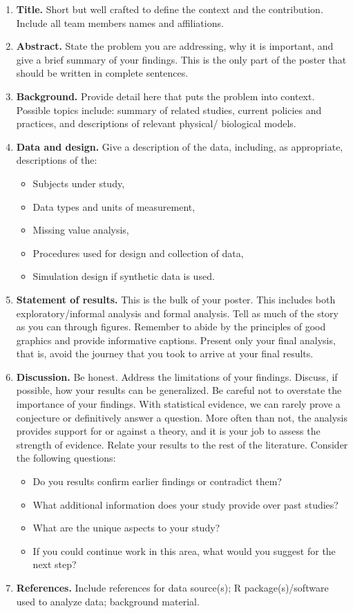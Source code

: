 \documentclass[11pt,onecolumn]{article}
\begin{document}
\begin{enumerate}
  \itemsep0em
\item{\bf Title.} Short but well crafted to define the context and the contribution. Include all team members names and  affiliations.
\item{\bf Abstract.} State the problem you are addressing, why it is important, and give a brief summary of your findings. This is the only part of the poster that should be written in complete sentences.
\item{\bf Background.} Provide detail here that puts the problem into context. Possible topics include: summary of related studies, current policies and practices, and descriptions of relevant physical/ biological models.
\item{\bf Data and design.} Give a description of the data, including, as appropriate, descriptions of the:
  \begin{itemize}
  \item Subjects under study,
  \item Data types and units of measurement,
  \item Missing value analysis,
  \item Procedures used for design and collection of data,
  \item Simulation design if synthetic data is used.
  \end{itemize}
    
\item{\bf Statement of results.} This is the bulk of your poster. This includes both exploratory/informal analysis and formal analysis. Tell as much of the story as you can through figures. Remember to abide by the principles of good graphics and provide informative captions. Present only your final analysis, that is, avoid the journey that you took to arrive at your final results.
\item{\bf Discussion.} Be honest. Address the limitations of your findings. Discuss, if possible, how your results can be generalized. Be careful not to overstate the importance of your findings. With statistical evidence, we can rarely prove a conjecture or definitively answer a question. More often than not, the analysis provides support for or against a theory, and it is your job to assess the strength of evidence. Relate your results to the rest of the literature. Consider the following questions:
  \begin{itemize}
  \item Do you results confirm earlier findings or contradict them?
  \item What additional information does your study provide over past studies?
  \item What are the unique aspects to your study?
    \item If you could continue work in this area, what would you suggest for the next step?
    \end{itemize}
  \item{\bf References.} Include references for data source(s); \textsc{R} package(s)/software used to analyze data; background material.
\end{enumerate}
\end{document}
